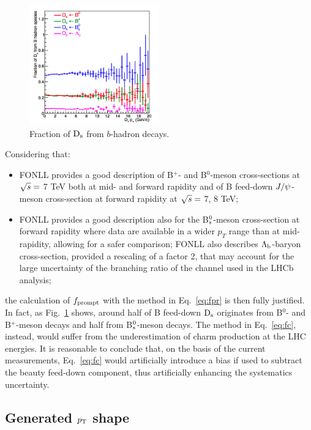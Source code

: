 \begin{figure}[!b]
\begin{center}
\includegraphics[width=0.5\textwidth]{FigCap4/DsParents.png}
\caption{Fraction of ${\rm D_s}$ from $b$-hadron decays.}
\label{fig:DsParents}
\end{center}
\end{figure}
Considering that:
\begin{itemize}
\item FONLL provides a good description of B$^{+}$- and B$^{0}$-meson 
cross-sections at $\sqrt{s} =$ 7 TeV both at mid- and forward rapidity and of 
B feed-down $J/{\rm \psi}$-meson cross-section at forward rapidity at  $\sqrt{s} =$ 7, 8 TeV;
\item FONLL provides a good description also for the 
B$^0_{\rm s}$-meson cross-section at forward rapidity where data are available in a wider $p_{T}$ range 
than at mid-rapidity, allowing for a safer comparison; FONLL also describes 
$\Lambda_{\rm b}$-baryon cross-section, provided 
a rescaling of a factor 2, that may account for 
the large uncertainty of the branching ratio of the channel used in the LHCb analysis;
\end{itemize}
the calculation of $f_{\rm prompt}$ with the method in Eq.~\ref{eq:fpr} is then fully justified.
In fact, as Fig.~\ref{fig:DsParents} shows, around half of B feed-down 
${\rm D_s}$ originates from B$^0$- and B$^+$-meson decays 
and half from B$^0_{\rm s}$-meson decays.
The method in Eq.~\ref{eq:fc}, instead, would suffer from the 
underestimation of charm production at the LHC energies. 
It is reasonable to conclude that, on the basis of the current 
measurements, Eq.~\ref{eq:fc} would artificially introduce a bias if 
used to subtract the beauty feed-down component, thus artificially enhancing 
the systematics uncertainty.


\subsection{Generated $p_{\rm T}$ shape}

